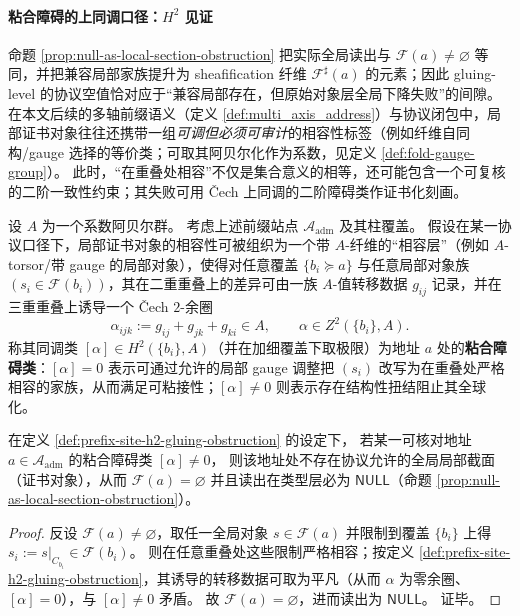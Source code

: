 \paragraph{粘合障碍的上同调口径：\texorpdfstring{$H^2$}{H2} 见证}
命题 \ref{prop:null-as-local-section-obstruction} 把实际全局读出与 \(\mathscr{F}(a)\neq\varnothing\) 等同，并把兼容局部家族提升为 sheafification 纤维 \(\mathscr{F}^{\sharp}(a)\) 的元素；因此 gluing-level 的协议空值恰对应于“兼容局部存在，但原始对象层全局下降失败”的间隙。
在本文后续的多轴前缀语义（定义 \ref{def:multi_axis_address}）与协议闭包中，局部证书对象往往还携带一组\emph{可调但必须可审计}的相容性标签（例如纤维自同构/gauge 选择的等价类；可取其阿贝尔化作为系数，见定义 \ref{def:fold-gauge-group}）。
此时，“在重叠处相容”不仅是集合意义的相等，还可能包含一个可复核的二阶一致性约束；其失败可用 Čech 上同调的二阶障碍类作证书化刻画。

\begin{definition}\label{def:prefix-site-h2-gluing-obstruction}
设 \(A\) 为一个系数阿贝尔群。
考虑上述前缀站点 \(\mathcal{A}_{\mathrm{adm}}\) 及其柱覆盖。
假设在某一协议口径下，局部证书对象的相容性可被组织为一个带 \(A\)-纤维的“相容层”（例如 \(A\)-torsor/带 gauge 的局部对象），使得对任意覆盖 \(\{b_i\succeq a\}\) 与任意局部对象族 \((s_i\in\mathscr{F}(b_i))\)，其在二重重叠上的差异可由一族 \(A\)-值转移数据 \(g_{ij}\) 记录，并在三重重叠上诱导一个 Čech \(2\)-余圈
\[
\alpha_{ijk}:=g_{ij}+g_{jk}+g_{ki}\in A,
\qquad
\alpha\in Z^2(\{b_i\},A).
\]
称其同调类 \([\alpha]\in H^2(\{b_i\},A)\)（并在加细覆盖下取极限）为地址 \(a\) 处的\textbf{粘合障碍类}：\([\alpha]=0\) 表示可通过允许的局部 gauge 调整把 \((s_i)\) 改写为在重叠处严格相容的家族，从而满足可粘接性；\([\alpha]\neq 0\) 则表示存在结构性扭结阻止其全球化。
\end{definition}

\begin{proposition}\label{prop:null-as-h2-obstruction}
在定义 \ref{def:prefix-site-h2-gluing-obstruction} 的设定下，
若某一可核对地址 \(a\in\mathcal{A}_{\mathrm{adm}}\) 的粘合障碍类 \([\alpha]\neq 0\)，
则该地址处不存在协议允许的全局局部截面（证书对象），从而
\(
\mathscr{F}(a)=\varnothing
\)
并且读出在类型层必为 \(\mathsf{NULL}\)（命题 \ref{prop:null-as-local-section-obstruction}）。
\end{proposition}

\begin{proof}
反设 \(\mathscr{F}(a)\neq\varnothing\)，取任一全局对象 \(s\in\mathscr{F}(a)\) 并限制到覆盖 \(\{b_i\}\) 上得 \(s_i:=s|_{C_{b_i}}\in\mathscr{F}(b_i)\)。
则在任意重叠处这些限制严格相容；按定义 \ref{def:prefix-site-h2-gluing-obstruction}，其诱导的转移数据可取为平凡（从而 \(\alpha\) 为零余圈、\([\alpha]=0\)），与 \([\alpha]\neq 0\) 矛盾。
故 \(\mathscr{F}(a)=\varnothing\)，进而读出为 \(\mathsf{NULL}\)。
证毕。
\end{proof}

